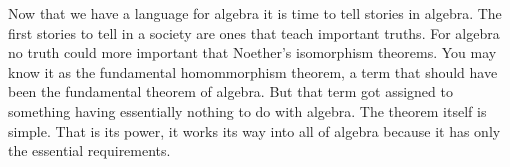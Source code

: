 
Now that we have a language for algebra it is time to tell stories in algebra.
The first stories to tell in a society are ones that teach important truths.
For algebra no truth could more important that Noether's isomorphism theorems.
You may know it as the fundamental homommorphism theorem, a term that should 
have been the fundamental theorem of algebra.  But that term got assigned to 
something having essentially nothing to do with algebra.  The theorem itself is 
simple.  That is its power, it works its way into all of algebra because it has 
only the essential requirements.